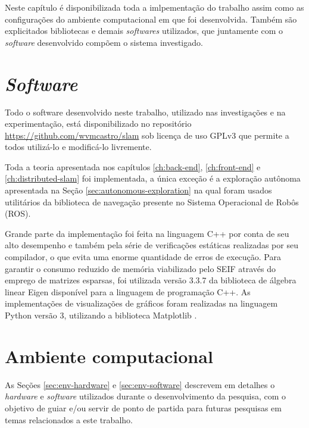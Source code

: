 Neste capítulo é disponibilizada toda a imlpementação do trabalho assim 
como as configurações do ambiente computacional em que foi desenvolvida. 
Também são explicitados bibliotecas e demais \textit{softwares} 
utilizados, que juntamente com o \textit{software} desenvolvido compõem o 
sistema investigado.

\section{\textit{Software}}

Todo o software desenvolvido neste trabalho, utilizado nas investigações 
e na experimentação, está disponibilizado no 
repositório \url{https://github.com/wvmcastro/slam} sob licença de uso 
GPLv3 que permite a todos utilizá-lo e modificá-lo livremente.

Toda a teoria apresentada nos capítulos \ref{ch:back-end}, \ref{ch:front-end} e \ref{ch:distributed-slam} foi implementada, a única 
exceção é a exploração autônoma apresentada na Seção \ref{sec:autonomous-exploration} na qual foram usados utilitários da 
biblioteca de navegação \cite{marder2010office} presente no Sistema 
Operacional de Robôs (ROS).

Grande parte da implementação foi feita na linguagem C++ por conta de 
seu alto desempenho e também pela série de verificações estáticas 
realizadas por seu compilador, o que evita uma enorme quantidade de 
erros de execução. Para garantir o consumo reduzido de memória viabilizado 
pelo SEIF através do emprego de matrizes esparsas, foi utilizada versão 3.3.7 
da biblioteca de álgebra linear Eigen \cite{eigen-lib} disponível para a linguagem de programação C++. As implementações 
de visualizações de gráficos foram realizadas na linguagem Python versão 
3, utilizando a biblioteca Matplotlib \cite{hunter2007matplotlib}.

\section{Ambiente computacional}

As Seções \ref{sec:env-hardware} e \ref{sec:env-software} descrevem em 
detalhes o \textit{hardware} e \textit{software} utilizados durante o 
desenvolvimento da pesquisa, com o objetivo de guiar e/ou servir de 
ponto de partida para futuras pesquisas em temas relacionados a este 
trabalho.

